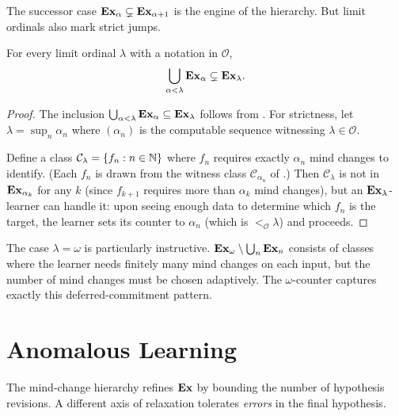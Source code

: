 The successor case $\mathbf{Ex}_\alpha \subsetneq \mathbf{Ex}_{\alpha+1}$ is the
engine of the hierarchy.  But limit ordinals also mark strict jumps.

\begin{prop}
\label{prop:limit-ordinals}
For every limit ordinal $\lambda$ with a notation in $\mathcal{O}$,
\[
  \bigcup_{\alpha < \lambda} \mathbf{Ex}_\alpha \subsetneq \mathbf{Ex}_\lambda.
\]
\end{prop}

\begin{proof}
The inclusion $\bigcup_{\alpha < \lambda} \mathbf{Ex}_\alpha \subseteq
\mathbf{Ex}_\lambda$ follows from .  For strictness,
let $\lambda = \sup_n \alpha_n$ where $(\alpha_n)$ is the computable
sequence witnessing $\lambda \in \mathcal{O}$.

Define a class $\mathcal{C}_\lambda = \{f_n : n \in \mathbb{N}\}$ where
$f_n$ requires exactly $\alpha_n$ mind changes to identify.  (Each
$f_n$ is drawn from the witness class $\mathcal{C}_{\alpha_n}$ of
.)  Then $\mathcal{C}_\lambda$ is not in
$\mathbf{Ex}_{\alpha_k}$ for any $k$ (since $f_{k+1}$ requires more than
$\alpha_k$ mind changes), but an $\mathbf{Ex}_\lambda$-learner can handle
it: upon seeing enough data to determine which $f_n$ is the target,
the learner sets its counter to $\alpha_n$ (which is
$<_{\mathcal{O}} \lambda$) and proceeds.
\end{proof}

\begin{remark}
\label{rem:omega-to-n}
The case $\lambda = \omega$ is particularly instructive.
$\mathbf{Ex}_\omega \setminus \bigcup_n \mathbf{Ex}_n$ consists of classes where the
learner needs finitely many mind changes on each input, but the
number of mind changes must be chosen adaptively.  The $\omega$-counter
captures exactly this deferred-commitment pattern.
\end{remark}



\section{Anomalous Learning}
\label{sec:anomalous}

The mind-change hierarchy refines $\mathbf{Ex}$ by bounding the number of
hypothesis revisions.  A different axis of relaxation tolerates
\emph{errors} in the final hypothesis.

